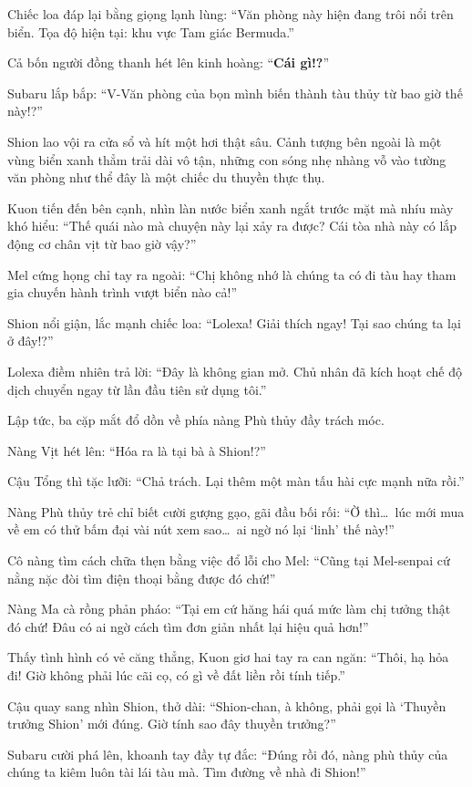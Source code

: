 \documentclass[../main.tex]{subfiles}
\begin{document}
Chiếc loa đáp lại bằng giọng lạnh lùng: ``Văn phòng này hiện đang trôi nổi trên biển. Tọa độ hiện tại: khu vực Tam giác Bermuda.''

Cả bốn người đồng thanh hét lên kinh hoàng: ``\textbf{Cái gì!?}''

Subaru lắp bắp: ``V-Văn phòng của bọn mình biến thành tàu thủy từ bao giờ thế này!?''

Shion lao vội ra cửa sổ và hít một hơi thật sâu. Cảnh tượng bên ngoài là một vùng biển xanh thẳm trải dài vô tận, những con sóng nhẹ nhàng vỗ vào tường văn phòng như thể đây là một chiếc du thuyền thực thụ.

Kuon tiến đến bên cạnh, nhìn làn nước biển xanh ngắt trước mặt mà nhíu mày khó hiểu: ``Thế quái nào mà chuyện này lại xảy ra được? Cái tòa nhà này có lắp động cơ chân vịt từ bao giờ vậy?''

Mel cứng họng chỉ tay ra ngoài: ``Chị không nhớ là chúng ta có đi tàu hay tham gia chuyến hành trình vượt biển nào cả!''

Shion nổi giận, lắc mạnh chiếc loa: ``Lolexa! Giải thích ngay! Tại sao chúng ta lại ở đây!?''

Lolexa điềm nhiên trả lời: ``Đây là không gian mở. Chủ nhân đã kích hoạt chế độ dịch chuyển ngay từ lần đầu tiên sử dụng tôi.''

Lập tức, ba cặp mắt đổ dồn về phía nàng Phù thủy đầy trách móc.

Nàng Vịt hét lên: ``Hóa ra là tại bà à Shion!?''

Cậu Tổng thì tặc lưỡi: ``Chả trách. Lại thêm một màn tấu hài cực mạnh nữa rồi.''

Nàng Phù thủy trẻ chỉ biết cười gượng gạo, gãi đầu bối rối: ``Ờ thì\dots\ lúc mới mua về em có thử bấm đại vài nút xem sao\dots\ ai ngờ nó lại `linh' thế này!''

Cô nàng tìm cách chữa thẹn bằng việc đổ lỗi cho Mel: ``Cũng tại Mel-senpai cứ nằng nặc đòi tìm điện thoại bằng được đó chứ!''

Nàng Ma cà rồng phản pháo: ``Tại em cứ hăng hái quá mức làm chị tưởng thật đó chứ! Đâu có ai ngờ cách tìm đơn giản nhất lại hiệu quả hơn!''

Thấy tình hình có vẻ căng thẳng, Kuon giơ hai tay ra can ngăn: ``Thôi, hạ hỏa đi! Giờ không phải lúc cãi cọ, có gì về đất liền rồi tính tiếp.''

Cậu quay sang nhìn Shion, thở dài: ``Shion-chan, à không, phải gọi là `Thuyền trưởng Shion' mới đúng. Giờ tính sao đây thuyền trưởng?''

Subaru cười phá lên, khoanh tay đầy tự đắc: ``Đúng rồi đó, nàng phù thủy của chúng ta kiêm luôn tài lái tàu mà. Tìm đường về nhà đi Shion!''
\end{document}
